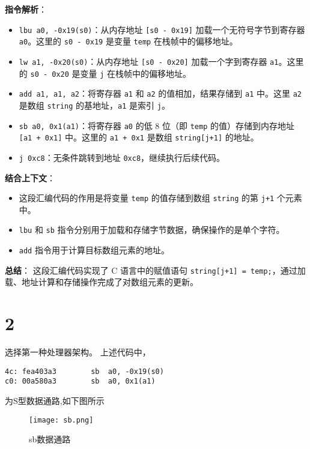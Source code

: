 \documentclass{ctexart}
\begin{document}
\textbf{指令解析}：
\begin{itemize}
    \item \texttt{lbu a0, -0x19(s0)}：从内存地址 \texttt{[s0 - 0x19]} 加载一个无符号字节到寄存器 \texttt{a0}。这里的 \texttt{s0 - 0x19} 是变量 \texttt{temp} 在栈帧中的偏移地址。
    \item \texttt{lw a1, -0x20(s0)}：从内存地址 \texttt{[s0 - 0x20]} 加载一个字到寄存器 \texttt{a1}。这里的 \texttt{s0 - 0x20} 是变量 \texttt{j} 在栈帧中的偏移地址。
    \item \texttt{add a1, a1, a2}：将寄存器 \texttt{a1} 和 \texttt{a2} 的值相加，结果存储到 \texttt{a1} 中。这里 \texttt{a2} 是数组 \texttt{string} 的基地址，\texttt{a1} 是索引 \texttt{j}。
    \item \texttt{sb a0, 0x1(a1)}：将寄存器 \texttt{a0} 的低 8 位（即 \texttt{temp} 的值）存储到内存地址 \texttt{[a1 + 0x1]} 中。这里的 \texttt{a1 + 0x1} 是数组 \texttt{string[j+1]} 的地址。
    \item \texttt{j 0xc8}：无条件跳转到地址 \texttt{0xc8}，继续执行后续代码。
\end{itemize}

\textbf{结合上下文}：
\begin{itemize}
    \item 这段汇编代码的作用是将变量 \texttt{temp} 的值存储到数组 \texttt{string} 的第 \texttt{j+1} 个元素中。
    \item \texttt{lbu} 和 \texttt{sb} 指令分别用于加载和存储字节数据，确保操作的是单个字符。
    \item \texttt{add} 指令用于计算目标数组元素的地址。
\end{itemize}

\textbf{总结}：
这段汇编代码实现了 C 语言中的赋值语句 \texttt{string[j+1] = temp;}，通过加载、地址计算和存储操作完成了对数组元素的更新。

\section*{2}
选择第一种处理器架构。
上述代码中，
\begin{verbatim}
4c: fea403a3     	sb	a0, -0x19(s0)
c0: 00a580a3     	sb	a0, 0x1(a1)
\end{verbatim}

为S型数据通路,如下图所示
\begin{figure}[H]
    \centering
    \texttt{[image: sb.png]} %
    \caption{sb数据通路}
    \label{fig:sb数据通路}
\end{figure}
\end{document}
